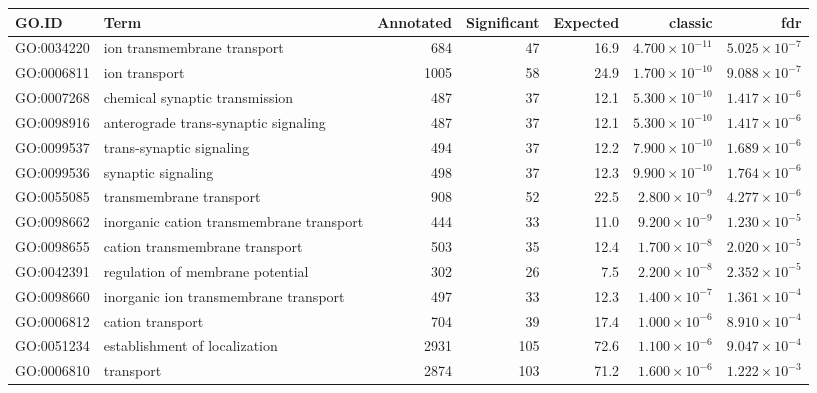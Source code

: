 \begin{table}[ht]
\centering
\begin{adjustbox}{width=\textwidth}

\begin{tabular}{llrrrrr}
  \hline
GO.ID & Term & Annotated & Significant & Expected & classic & fdr \\ 
  \hline
GO:0034220 & ion transmembrane transport & 684 & 47 & 16.9 & $4.700 \times 10^{-11}$ & $5.025 \times 10^{-7}$ \\ 
  GO:0006811 & ion transport & 1005 & 58 & 24.9 & $1.700 \times 10^{-10}$ & $9.088 \times 10^{-7}$ \\ 
  GO:0007268 & chemical synaptic transmission & 487 & 37 & 12.1 & $5.300 \times 10^{-10}$ & $1.417 \times 10^{-6}$ \\ 
  GO:0098916 & anterograde trans-synaptic signaling & 487 & 37 & 12.1 & $5.300 \times 10^{-10}$ & $1.417 \times 10^{-6}$ \\ 
  GO:0099537 & trans-synaptic signaling & 494 & 37 & 12.2 & $7.900 \times 10^{-10}$ & $1.689 \times 10^{-6}$ \\ 
  GO:0099536 & synaptic signaling & 498 & 37 & 12.3 & $9.900 \times 10^{-10}$ & $1.764 \times 10^{-6}$ \\ 
  GO:0055085 & transmembrane transport & 908 & 52 & 22.5 & $2.800 \times 10^{-9}$ & $4.277 \times 10^{-6}$ \\ 
  GO:0098662 & inorganic cation transmembrane transport & 444 & 33 & 11.0 & $9.200 \times 10^{-9}$ & $1.230 \times 10^{-5}$ \\ 
  GO:0098655 & cation transmembrane transport & 503 & 35 & 12.4 & $1.700 \times 10^{-8}$ & $2.020 \times 10^{-5}$ \\ 
  GO:0042391 & regulation of membrane potential & 302 & 26 & 7.5 & $2.200 \times 10^{-8}$ & $2.352 \times 10^{-5}$ \\ 
  GO:0098660 & inorganic ion transmembrane transport & 497 & 33 & 12.3 & $1.400 \times 10^{-7}$ & $1.361 \times 10^{-4}$ \\ 
  GO:0006812 & cation transport & 704 & 39 & 17.4 & $1.000 \times 10^{-6}$ & $8.910 \times 10^{-4}$ \\ 
  GO:0051234 & establishment of localization & 2931 & 105 & 72.6 & $1.100 \times 10^{-6}$ & $9.047 \times 10^{-4}$ \\ 
  GO:0006810 & transport & 2874 & 103 & 71.2 & $1.600 \times 10^{-6}$ & $1.222 \times 10^{-3}$ \\ 

\end{tabular}
\end{adjustbox}
\end{table}
